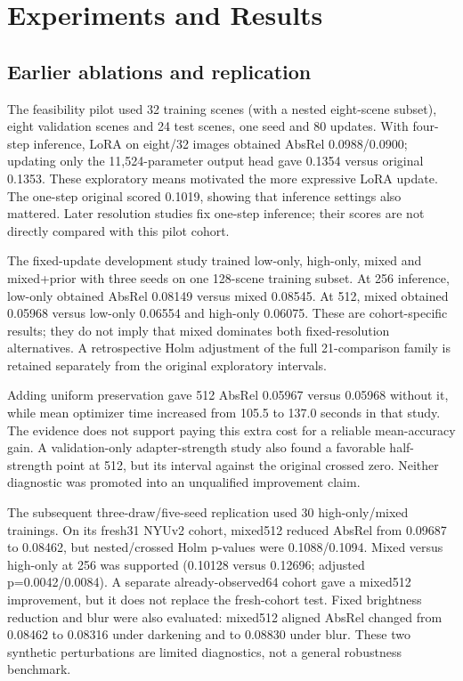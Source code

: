 \section{Experiments and Results}
\subsection{Earlier ablations and replication}
The feasibility pilot used 32 training scenes (with a nested eight-scene subset), eight validation scenes and 24 test scenes, one seed and 80 updates. With four-step inference, LoRA on eight/32 images obtained AbsRel 0.0988/0.0900; updating only the 11,524-parameter output head gave 0.1354 versus original 0.1353. These exploratory means motivated the more expressive LoRA update. The one-step original scored 0.1019, showing that inference settings also mattered. Later resolution studies fix one-step inference; their scores are not directly compared with this pilot cohort.

The fixed-update development study trained low-only, high-only, mixed and mixed+prior with three seeds on one 128-scene training subset. At 256 inference, low-only obtained AbsRel 0.08149 versus mixed 0.08545. At 512, mixed obtained 0.05968 versus low-only 0.06554 and high-only 0.06075. These are cohort-specific results; they do not imply that mixed dominates both fixed-resolution alternatives. A retrospective Holm adjustment of the full 21-comparison family is retained separately from the original exploratory intervals.

Adding uniform preservation gave 512 AbsRel 0.05967 versus 0.05968 without it, while mean optimizer time increased from 105.5 to 137.0 seconds in that study. The evidence does not support paying this extra cost for a reliable mean-accuracy gain. A validation-only adapter-strength study also found a favorable half-strength point at 512, but its interval against the original crossed zero. Neither diagnostic was promoted into an unqualified improvement claim.

The subsequent three-draw/five-seed replication used 30 high-only/mixed trainings. On its fresh31 NYUv2 cohort, mixed512 reduced AbsRel from 0.09687 to 0.08462, but nested/crossed Holm p-values were 0.1088/0.1094. Mixed versus high-only at 256 was supported (0.10128 versus 0.12696; adjusted p=0.0042/0.0084). A separate already-observed64 cohort gave a mixed512 improvement, but it does not replace the fresh-cohort test. Fixed brightness reduction and blur were also evaluated: mixed512 aligned AbsRel changed from 0.08462 to 0.08316 under darkening and to 0.08830 under blur. These two synthetic perturbations are limited diagnostics, not a general robustness benchmark.

